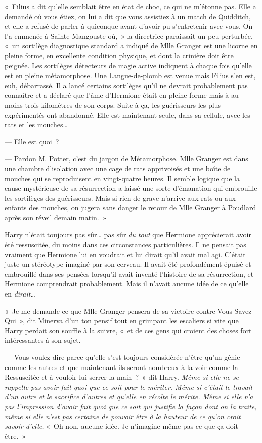 «~Filius a dit qu'elle semblait être en état de choc, ce qui ne m'étonne pas. Elle a demandé où vous étiez, on lui a dit que vous assistiez à un match de Quidditch, et elle a refusé de parler à quiconque avant d'avoir pu s'entretenir avec vous. On l'a emmenée à Sainte Mangouste où,~» la directrice paraissait un peu perturbée, «~un sortilège diagnostique standard a indiqué de Mlle Granger est une licorne en pleine forme, en excellente condition physique, et dont la crinière doit être peignée. Les sortilèges détecteurs de magie active indiquent à chaque fois qu'elle est en pleine métamorphose. Une Langue-de-plomb est venue mais Filius s'en est, euh, débarrassé. Il a lancé certains sortilèges qu'il ne devrait probablement pas connaître et a déclaré que l'âme d'Hermione était en pleine forme mais à au moins trois kilomètres de son corps. Suite à ça, les guérisseurs les plus expérimentés ont abandonné. Elle est maintenant seule, dans sa cellule, avec les rats et les mouches…

--- Elle est quoi~?

--- Pardon M. Potter, c'est du jargon de Métamorphose. Mlle Granger est dans une chambre d'isolation avec une cage de rats apprivoisés et une boîte de mouches qui se reproduisent en vingt-quatre heures. Il semble logique que la cause mystérieuse de sa résurrection a laissé une sorte d'émanation qui embrouille les sortilèges des guérisseurs. Mais si rien de grave n'arrive aux rats ou aux enfants des mouches, on jugera sans danger le retour de Mlle Granger à Poudlard après son réveil demain matin.~»

Harry n'était toujours pas sûr… pas sûr \emph{du tout} que Hermione apprécierait avoir été ressuscitée, du moins dans ces circonstances particulières. Il ne pensait pas vraiment que Hermione lui en voudrait et lui dirait qu'il avait mal agi. C'était juste un stéréotype imaginé par son cerveau. Il avait été profondément épuisé et embrouillé dans ses pensées lorsqu'il avait inventé l'histoire de sa résurrection, et Hermione comprendrait probablement. Mais il n'avait aucune idée de ce qu'elle en \emph{dirait}…

«~Je me demande ce que Mlle Granger pensera de sa victoire contre Vous-Savez-Qui~», dit Minerva d'un ton pensif tout en grimpant les escaliers si vite que Harry perdait son souffle à la suivre, «~et de ces gens qui croient des choses fort intéressantes à son sujet.

--- Vous voulez dire parce qu'elle s'est toujours considérée n'être qu'un génie comme les autres et que maintenant ils seront nombreux à la voir comme la Ressuscitée et à vouloir lui serrer la main~?~» dit Harry. \emph{Même si elle ne se rappelle pas avoir fait quoi que ce soit pour le mériter. Même si c'était le travail d'un autre et le sacrifice d'autres et qu'elle en récolte le mérite. Même si elle n'a pas l'impression d'avoir fait quoi que ce soit qui justifie la façon dont on la traite, même si elle n'est pas certaine de pouvoir être à la hauteur de ce qu'on croit savoir d'elle.} «~Oh non, aucune idée. Je n'imagine même pas ce que ça doit être.~»

